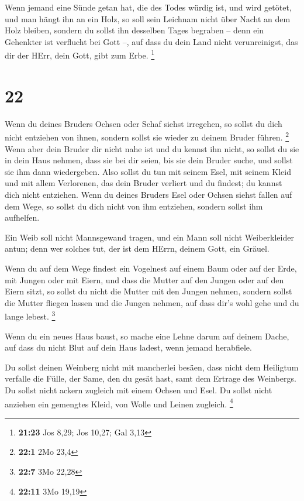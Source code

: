 Wenn jemand eine Sünde getan hat, die des Todes würdig
ist, und wird getötet, und man hängt ihn an ein Holz,  so
soll sein Leichnam nicht über Nacht an dem Holz bleiben, sondern du
sollst ihn desselben Tages begraben -- denn ein Gehenkter ist verflucht
bei Gott --, auf dass du dein Land nicht verunreinigst, das dir der
HErr, dein Gott, gibt zum Erbe. \footnote{\textbf{21:23} Jos 8,29; Jos
  10,27; Gal 3,13}

\hypertarget{section-4}{%
\section{22}\label{section-4}}

 Wenn du deines Bruders Ochsen oder Schaf siehst irregehen,
so sollst du dich nicht entziehen von ihnen, sondern sollst sie wieder
zu deinem Bruder führen. \footnote{\textbf{22:1} 2Mo 23,4} 
Wenn aber dein Bruder dir nicht nahe ist und du kennst ihn nicht, so
sollst du sie in dein Haus nehmen, dass sie bei dir seien, bis sie dein
Bruder suche, und sollst sie ihm dann wiedergeben.  Also
sollst du tun mit seinem Esel, mit seinem Kleid und mit allem
Verlorenen, das dein Bruder verliert und du findest; du kannst dich
nicht entziehen.  Wenn du deines Bruders Esel oder Ochsen
siehst fallen auf dem Wege, so sollst du dich nicht von ihm entziehen,
sondern sollst ihm aufhelfen.

 Ein Weib soll nicht Mannsgewand tragen, und ein Mann soll
nicht Weiberkleider antun; denn wer solches tut, der ist dem HErrn,
deinem Gott, ein Gräuel.

 Wenn du auf dem Wege findest ein Vogelnest auf einem Baum
oder auf der Erde, mit Jungen oder mit Eiern, und dass die Mutter auf
den Jungen oder auf den Eiern sitzt, so sollst du nicht die Mutter mit
den Jungen nehmen,  sondern sollst die Mutter fliegen lassen
und die Jungen nehmen, auf dass dir's wohl gehe und du lange lebest.
\footnote{\textbf{22:7} 3Mo 22,28}

 Wenn du ein neues Haus baust, so mache eine Lehne darum auf
deinem Dache, auf dass du nicht Blut auf dein Haus ladest, wenn jemand
herabfiele.

 Du sollst deinen Weinberg nicht mit mancherlei besäen, dass
nicht dem Heiligtum verfalle die Fülle, der Same, den du gesät hast,
samt dem Ertrage des Weinbergs.  Du sollst nicht ackern
zugleich mit einem Ochsen und Esel.  Du sollst nicht
anziehen ein gemengtes Kleid, von Wolle und Leinen zugleich. \footnote{\textbf{22:11}
  3Mo 19,19}

